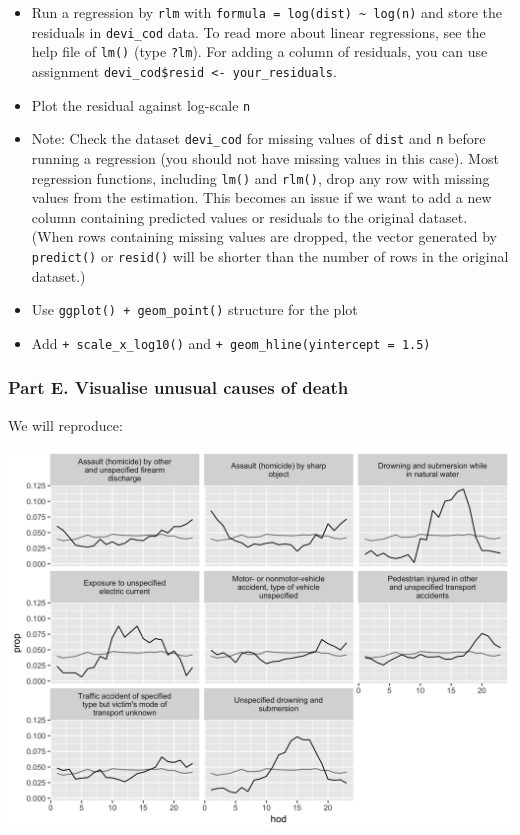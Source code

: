 \documentclass[]{book}
\theoremstyle{definition}
\theoremstyle{definition}
\theoremstyle{remark}
\begin{document}
\begin{itemize}
\item
  Run a regression by \texttt{rlm} with
  \texttt{formula\ =\ log(dist)\ \textasciitilde{}\ log(n)} and store
  the residuals in \texttt{devi\_cod} data. To read more about linear
  regressions, see the help file of \texttt{lm()} (type \texttt{?lm}).
  For adding a column of residuals, you can use assignment
  \texttt{devi\_cod\$resid\ \textless{}-\ your\_residuals}.
\item
  Plot the residual against log-scale \texttt{n}
\item
  Note: Check the dataset \texttt{devi\_cod} for missing values of
  \texttt{dist} and \texttt{n} before running a regression (you should
  not have missing values in this case). Most regression functions,
  including \texttt{lm()} and \texttt{rlm()}, drop any row with missing
  values from the estimation. This becomes an issue if we want to add a
  new column containing predicted values or residuals to the original
  dataset. (When rows containing missing values are dropped, the vector
  generated by \texttt{predict()} or \texttt{resid()} will be shorter
  than the number of rows in the original dataset.)
\item
  Use \texttt{ggplot()\ +\ geom\_point()} structure for the plot
\item
  Add \texttt{+\ scale\_x\_log10()} and
  \texttt{+\ geom\_hline(yintercept\ =\ 1.5)}
\end{itemize}

\subsubsection*{Part E. Visualise unusual causes of
death}\label{part-e.-visualise-unusual-causes-of-death}

We will reproduce:

\begin{center}\includegraphics[width=1\linewidth]{tidy_case_study/unusual-big} \end{center}
\end{document}
